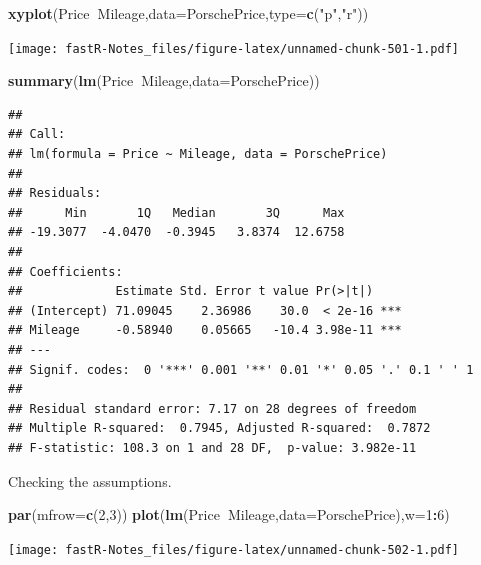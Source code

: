 \documentclass[]{book}
\newenvironment{Shaded}{\begin{snugshade}}{\end{snugshade}}
\newcommand{\KeywordTok}[1]{\textcolor[rgb]{0.13,0.29,0.53}{\textbf{#1}}}
\newcommand{\DataTypeTok}[1]{\textcolor[rgb]{0.13,0.29,0.53}{#1}}
\newcommand{\DecValTok}[1]{\textcolor[rgb]{0.00,0.00,0.81}{#1}}
\newcommand{\StringTok}[1]{\textcolor[rgb]{0.31,0.60,0.02}{#1}}
\newcommand{\OperatorTok}[1]{\textcolor[rgb]{0.81,0.36,0.00}{\textbf{#1}}}
\newcommand{\NormalTok}[1]{#1}
\theoremstyle{definition}
\theoremstyle{definition}
\theoremstyle{definition}
\theoremstyle{remark}
\begin{document}
\begin{Shaded}
\begin{Highlighting}[]
\KeywordTok{xyplot}\NormalTok{(Price}\OperatorTok{~}\NormalTok{Mileage,}\DataTypeTok{data=}\NormalTok{PorschePrice,}\DataTypeTok{type=}\KeywordTok{c}\NormalTok{(}\StringTok{"p"}\NormalTok{,}\StringTok{"r"}\NormalTok{))}
\end{Highlighting}
\end{Shaded}

\texttt{[image: fastR-Notes\_files/figure-latex/unnamed-chunk-501-1.pdf]}

\begin{Shaded}
\begin{Highlighting}[]
\KeywordTok{summary}\NormalTok{(}\KeywordTok{lm}\NormalTok{(Price}\OperatorTok{~}\NormalTok{Mileage,}\DataTypeTok{data=}\NormalTok{PorschePrice))}
\end{Highlighting}
\end{Shaded}

\begin{verbatim}
## 
## Call:
## lm(formula = Price ~ Mileage, data = PorschePrice)
## 
## Residuals:
##      Min       1Q   Median       3Q      Max 
## -19.3077  -4.0470  -0.3945   3.8374  12.6758 
## 
## Coefficients:
##             Estimate Std. Error t value Pr(>|t|)    
## (Intercept) 71.09045    2.36986    30.0  < 2e-16 ***
## Mileage     -0.58940    0.05665   -10.4 3.98e-11 ***
## ---
## Signif. codes:  0 '***' 0.001 '**' 0.01 '*' 0.05 '.' 0.1 ' ' 1
## 
## Residual standard error: 7.17 on 28 degrees of freedom
## Multiple R-squared:  0.7945, Adjusted R-squared:  0.7872 
## F-statistic: 108.3 on 1 and 28 DF,  p-value: 3.982e-11
\end{verbatim}

Checking the assumptions.

\begin{Shaded}
\begin{Highlighting}[]
\KeywordTok{par}\NormalTok{(}\DataTypeTok{mfrow=}\KeywordTok{c}\NormalTok{(}\DecValTok{2}\NormalTok{,}\DecValTok{3}\NormalTok{))}
\KeywordTok{plot}\NormalTok{(}\KeywordTok{lm}\NormalTok{(Price}\OperatorTok{~}\NormalTok{Mileage,}\DataTypeTok{data=}\NormalTok{PorschePrice),}\DataTypeTok{w=}\DecValTok{1}\OperatorTok{:}\DecValTok{6}\NormalTok{)}
\end{Highlighting}
\end{Shaded}

\texttt{[image: fastR-Notes\_files/figure-latex/unnamed-chunk-502-1.pdf]}
\end{document}
